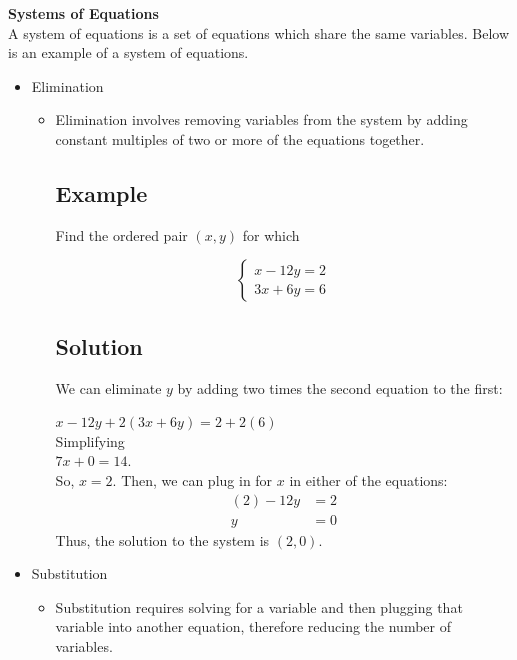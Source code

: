 \documentclass[11pt,letterpaper]{article}
\begin{document}
\begin{minipage}{\textwidth}
     \vspace{0.4cm}
     \noindent \textbf{Systems of Equations}\\
     A system of equations is a set of equations which share the same variables. Below is an example of a system of equations.
     \begin{itemize}
          \item Elimination
          \begin{itemize}
               \item  Elimination involves removing variables from the system by adding constant multiples of two or more of the equations together.

               \subsection*{Example}
               Find the ordered pair $(x,y)$ for which
               
               \[\left\{\begin{array}{l}x-12y=2\\3x+6y=6\end{array}\right.\]
               \subsection*{Solution}
               We can eliminate $y$ by adding two times the second equation to the first:
               
               $x - 12y + 2(3x+6y)= 2 + 2(6)$
               \\
               Simplifying
               \\${7x + 0=14}$.
               \\
               So, $x=2$. Then, we can plug in for $x$ in either of the equations:\begin{align*} (2)-12y &= 2 \\ y &= 0 \end{align*}
               Thus, the solution to the system is $(2,0)$.
          \end{itemize}
          \item Substitution
          \begin{itemize}
               \item Substitution requires solving for a variable and then plugging that variable into another equation, therefore reducing the number of variables.


\end{itemize}
\end{itemize}
\end{minipage}
\end{document}
